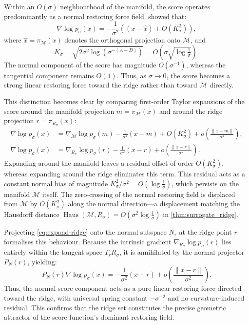 \documentclass{article}
\newcommand{\M}{\mathcal{M}}
\theoremstyle{plain}
\theoremstyle{definition}
\theoremstyle{remark}
\begin{document}
Within an $O(\sigma)$ neighbourhood of the manifold, the score operates predominantly as a normal restoring force field. \citet{genovese2014nonparametric} showed that:
\begin{equation}
    \nabla \log p_\sigma(x) = -\frac{1}{\sigma^2}\left((x - \hat{x}) + O(K_\sigma^2)\right),
\end{equation}
where $\hat{x} = \pi_\M(x)$ denotes the orthogonal projection onto $\M$, and
\begin{equation}
    K_\sigma = \sqrt{2\sigma^2 \log\left(\sigma^{-(A+D)}\right)} = O\left(\sigma\sqrt{\log \tfrac{1}{\sigma}}\right).
\end{equation}
The normal component of the score has magnitude $O(\sigma^{-1})$, whereas the tangential component remains $O(1)$. Thus, as $\sigma \to 0$, the score becomes a strong linear restoring force toward the ridge rather than toward $\M$ directly.

This distinction becomes clear by comparing first-order Taylor expansions of the score around the manifold projection $m = \pi_\M(x)$ and around the ridge projection $r = \pi_{R_\sigma}(x)$:
\begin{align}
    \nabla \log p_\sigma(x)
        &= \nabla_\M \log p_\sigma(m)
           - \frac{1}{\sigma^2}(x - m)
           + O(K_\sigma^2)
           + o\!\left(\frac{\|x - m\|}{\sigma^2}\right),
        \label{eq:expand-manifold} \\[2pt]
    \nabla \log p_\sigma(x)
        &= \nabla_{R_\sigma} \log p_\sigma(r)
           - \frac{1}{\sigma^2}(x - r)
           + o\!\left(\frac{\|x - r\|}{\sigma^2}\right).
        \label{eq:expand-ridge}
\end{align}
Expanding around the manifold leaves a residual offset of order $O(K_\sigma^2)$, whereas expanding around the ridge eliminates this term. This residual acts as a constant normal bias of magnitude $K_\sigma^2 / \sigma^2 = O(\log \frac{1}{\sigma})$, which persists on the manifold $\M$ itself. The zero-crossing of the normal restoring field is displaced from $\M$ by $O(K_\sigma^2)$ along the normal direction—a displacement matching the Hausdorff distance $\operatorname{Haus}(\M, R_\sigma) = O(\sigma^2 \log \frac{1}{\sigma})$ in \autoref{thm:surrogate_ridge}.

Projecting \eqref{eq:expand-ridge} onto the normal subspace $N_r$ at the ridge point $r$ formalises this behaviour. Because the intrinsic gradient $\nabla_{R_\sigma} \log p_\sigma(r)$ lies entirely within the tangent space $T_r R_\sigma$, it is annihilated by the normal projector $P_N(r)$, yielding:
\begin{equation}
    P_N(r) \nabla \log p_\sigma(x)
        = -\frac{1}{\sigma^2}(x - r)
          + o\!\left(\frac{\|x - r\|}{\sigma^2}\right).
\end{equation}
Thus, the normal score component acts as a pure linear restoring force directed toward the ridge, with universal spring constant $-\sigma^{-2}$ and no curvature-induced residual. This confirms that the ridge set constitutes the precise geometric attractor of the score function's dominant restoring field.
\end{document}

